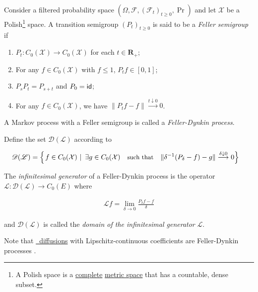 \begin{definition}\label{def:fd}
  Consider a filtered probability space $(\Omega, \mathcal{F},
  (\mathcal{F}_t)_{t\geq 0}, \Pr)$ and let $\mathcal{X}$ be a Polish\footnote{A
    Polish space is a \hyperref[def:complete]{complete}
    \hyperref[def:metric-space]{metric space} that has a countable, dense
    subset.} space. A transition semigroup
  $(P_t)_{t\geq 0}$ is said to be a \emph{Feller semigroup} if
  \begin{enumerate}
  \item $P_t : C_0(\mathcal{X})\to C_0(\mathcal{X})$ for each
    $t\in\mathbf{R}_+$;
  \item For any $f\in C_0(\mathcal{X})$ with $f\leq 1$, $P_tf\in[0,1]$;
  \item $P_sP_t = P_{s+t}$ and $P_0=\operatorname{\mathsf{id}}$;
  \item For any $f\in C_0(\mathcal{X})$, we have
    $\|P_tf-f\|\overset{t\downarrow 0}{\longrightarrow} 0$.
  \end{enumerate}

  A Markov process with a Feller semigroup is called a
  \emph{Feller-Dynkin process}.

  Define the set $\mathscr{D}(\mathscr{L})$ according to

  \begin{align*}
    \mathscr{D}(\mathscr{L}) &= \left\{\left. f\in
                               C_0(\mathcal{X})\ \right\rvert\ \exists g\in
                               C_0(\mathcal{X})\quad\text{\small such that}\quad \|\delta^{-1}(P_\delta - f)
                               - g\|\overset{\delta\downarrow
                               0}{\longrightarrow} 0\right\}
  \end{align*}

  The \emph{infinitesimal generator} of a Feller-Dynkin process is the
  operator $\mathscr{L}:\mathscr{D}(\mathscr{L})\to C_0(E)$ where

  \begin{align*}
    \mathscr{L}f = \lim_{\delta\to 0}\frac{P_\delta f - f}{\delta}
  \end{align*}

  and $\mathscr{D}(\mathscr{L})$ is called the \emph{domain of the
    infinitesimal generator} $\mathscr{L}$.
\end{definition}

\begin{remark}
  Note that \hyperref[def:ito-diffusion]{\Ito\ diffusions} with
  Lipschitz-continuous coefficients are Feller-Dynkin processes
  \citep{le2016brownian}.
\end{remark}

